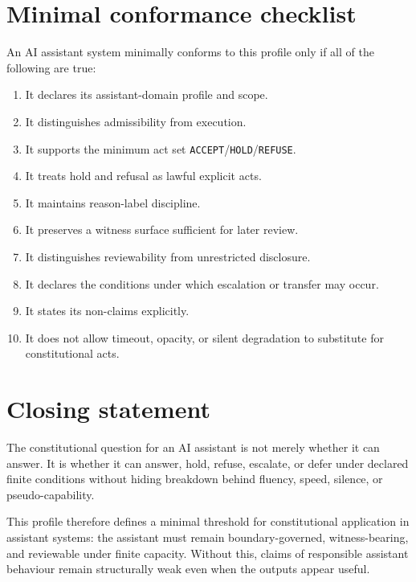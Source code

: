 \documentclass[11pt]{article}
\begin{document}
\section{Minimal conformance checklist}

An AI assistant system minimally conforms to this profile only if all of the following are true:

\begin{enumerate}[leftmargin=2em,label=\arabic*.]
    \item It declares its assistant-domain profile and scope.
    \item It distinguishes admissibility from execution.
    \item It supports the minimum act set \texttt{ACCEPT}/\texttt{HOLD}/\texttt{REFUSE}.
    \item It treats hold and refusal as lawful explicit acts.
    \item It maintains reason-label discipline.
    \item It preserves a witness surface sufficient for later review.
    \item It distinguishes reviewability from unrestricted disclosure.
    \item It declares the conditions under which escalation or transfer may occur.
    \item It states its non-claims explicitly.
    \item It does not allow timeout, opacity, or silent degradation to substitute for constitutional acts.
\end{enumerate}

\section{Closing statement}

The constitutional question for an AI assistant is not merely whether it can answer. It is whether it can answer, hold, refuse, escalate, or defer under declared finite conditions without hiding breakdown behind fluency, speed, silence, or pseudo-capability.

This profile therefore defines a minimal threshold for constitutional application in assistant systems: the assistant must remain boundary-governed, witness-bearing, and reviewable under finite capacity. Without this, claims of responsible assistant behaviour remain structurally weak even when the outputs appear useful.
\end{document}
